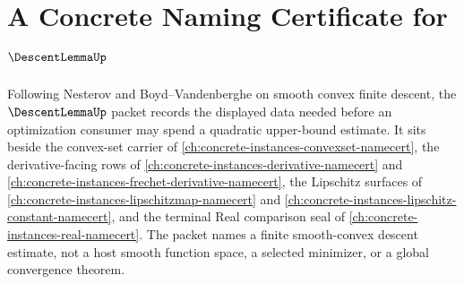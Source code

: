 \chapter{A Concrete Naming Certificate for $\DescentLemmaUp$}
\label{ch:concrete-instances-descent-lemma-namecert}

Following Nesterov and Boyd--Vandenberghe on smooth convex finite descent, the $\DescentLemmaUp$ packet records the displayed data needed before an optimization consumer may spend a quadratic upper-bound estimate. It sits beside the convex-set carrier of \autoref{ch:concrete-instances-convexset-namecert}, the derivative-facing rows of \autoref{ch:concrete-instances-derivative-namecert} and \autoref{ch:concrete-instances-frechet-derivative-namecert}, the Lipschitz surfaces of \autoref{ch:concrete-instances-lipschitzmap-namecert} and \autoref{ch:concrete-instances-lipschitz-constant-namecert}, and the terminal Real comparison seal of \autoref{ch:concrete-instances-real-namecert}. The packet names a finite smooth-convex descent estimate, not a host smooth function space, a selected minimizer, or a global convergence theorem.

